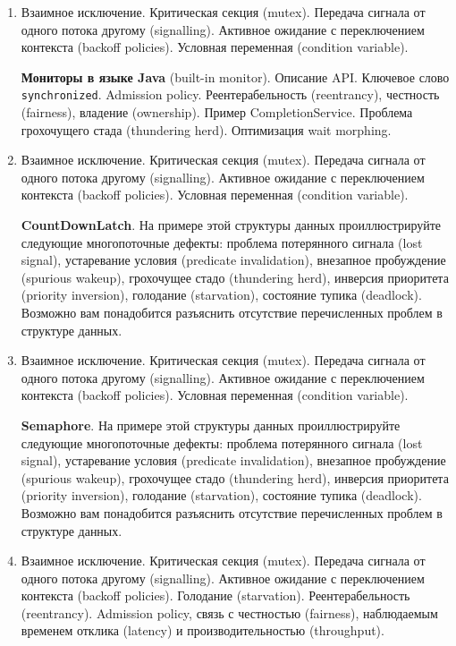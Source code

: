 \documentclass[a4paper, 12pt]{extarticle}
\begin{document}
\begin{enumerate}[\thesection .1]
	\item Взаимное исключение. Критическая секция (mutex). Передача сигнала от одного потока другому (signalling). Активное ожидание с переключением контекста (backoff policies). Условная переменная (condition variable).

	\textbf{Мониторы в языке Java} (built-in monitor). Описание API. Ключевое слово \texttt{synchronized}. Admission policy. Реентерабельность (reentrancy), честность (fairness), владение (ownership). Пример CompletionService. Проблема грохочущего стада (thundering herd). Оптимизация wait morphing.
	
	\item Взаимное исключение. Критическая секция (mutex). Передача сигнала от одного потока другому (signalling). Активное ожидание с переключением контекста (backoff policies). Условная переменная (condition variable).

	\textbf{CountDownLatch}. На примере этой структуры данных проиллюстрируйте следующие многопоточные дефекты: проблема потерянного сигнала (lost signal), устаревание условия (predicate invalidation), внезапное пробуждение (spurious wakeup), грохочущее стадо (thundering herd), инверсия приоритета (priority inversion), голодание (starvation), состояние тупика (deadlock). Возможно вам понадобится разъяснить отсутствие перечисленных проблем в структуре данных. 

	\item Взаимное исключение. Критическая секция (mutex). Передача сигнала от одного потока другому (signalling). Активное ожидание с переключением контекста (backoff policies). Условная переменная (condition variable).
 
	\textbf{Semaphore}. На примере этой структуры данных проиллюстрируйте следующие многопоточные дефекты: проблема потерянного сигнала (lost signal), устаревание условия (predicate invalidation), внезапное пробуждение (spurious wakeup), грохочущее стадо (thundering herd), инверсия приоритета (priority inversion), голодание (starvation),  состояние тупика (deadlock). Возможно вам понадобится разъяснить отсутствие перечисленных проблем в структуре данных. 

	
	\item Взаимное исключение. Критическая секция (mutex). Передача сигнала от одного потока другому (signalling). Активное ожидание с переключением контекста (backoff policies). Голодание (starvation). Реентерабельность (reentrancy). Admission policy, связь с честностью (fairness), наблюдаемым временем отклика (latency) и производительностью (throughput).


\end{enumerate}
\end{document}
